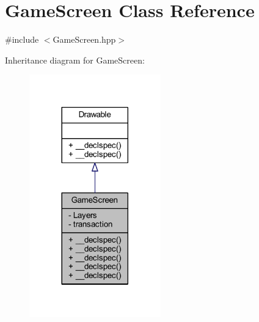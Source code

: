\hypertarget{class_game_screen}{\section{Game\-Screen Class Reference}
\label{class_game_screen}
}


{\ttfamily \#include $<$Game\-Screen.\-hpp$>$}



Inheritance diagram for Game\-Screen\-:
\nopagebreak
\begin{figure}[H]
\begin{center}
\leavevmode
\includegraphics[width=161pt]{class_game_screen__inherit__graph}
\end{center}
\end{figure}



